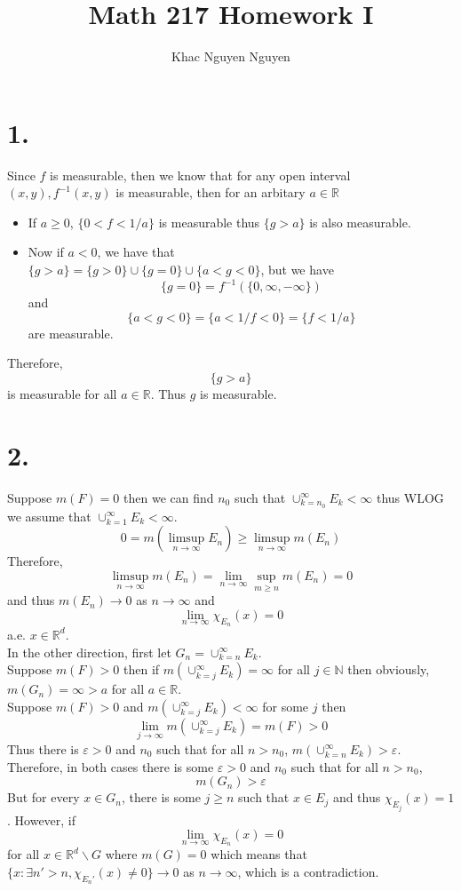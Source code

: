 \documentclass[11pt]{article}
\title{\textbf{Math 217 Homework I}}
\author{Khac Nguyen Nguyen}
\date{}
\theoremstyle{mystyle}
\theoremstyle{definition}
\begin{document}
\section*{1.}
Since $f$ is measurable, then we know that for any open interval $(x,y), f^{-1}(x,y)$ is measurable, then for an arbitary $a \in \mathbb{R}$
\begin{itemize}
  \item If $a \ge 0$, $\{0 < f < 1/a \}$ is measurable thus $\{g > a \}$ is also measurable. 
  \item Now if $a < 0$, we have that \\
    $\{g > a\} = \{g > 0\} \cup \{g = 0\} \cup \{a < g < 0\}$, but we have 
    \[
      \{g = 0 \} = f^{-1}(\{0, \infty, -\infty\})
    \]
    and
    \[
      \{a < g < 0\} = \{a < 1/f < 0\} = \{f < 1/a\}
    \]
    are measurable.  
\end{itemize}
Therefore, 
\[
  \{g>a\}
\]
is measurable for all $a \in \mathbb{R}$. Thus $g$ is measurable.
\newpage
\section*{2.}
Suppose $m(F) = 0$ then we can find $n_0$ such that $\cup_{k = n_0}^\infty E_k < \infty$ thus WLOG we assume that $\cup_{k=1}^\infty E_k < \infty$.  
\[
  0 = m(\limsup_{n \to \infty} E_n) \ge \limsup_{n \to \infty} m(E_n)
\]
Therefore, 
\[
  \limsup_{n \to \infty} m(E_n) = \lim_{n \to \infty} \sup_{m \ge n} m(E_n) = 0
\]
and thus $m(E_n) \to 0$ as $n \to \infty$ and 
\[
  \lim_{n \to \infty} \chi_{E_n}(x) = 0
\]
a.e. $x \in \mathbb{R}^d$. \\
In the other direction, first let $G_n = \cup_{k=n}^\infty E_k$. \\
Suppose $m(F) > 0$ then if $m\left(\cup_{k=j}^\infty E_k \right) = \infty$ for all $j \in \mathbb{N}$ then obviously, $m(G_n) = \infty > a$ for all $a \in \mathbb{R}$. \\ 
Suppose $m(F) > 0$ and $m\left(\cup_{k=j}^\infty E_k \right) < \infty$ for some $j$ then 
\[
  \lim_{j \to \infty} m(\cup_{k=j}^\infty E_k) = m(F) > 0
\]
Thus there is $\varepsilon > 0$ and $n_0$ such that for all $n>n_0$, $m(\cup_{k=n}^\infty E_k) > \varepsilon$. \\
Therefore, in both cases there is some $\varepsilon > 0$ and $n_0$ such that for all $n>n_0$, 
\[
  m(G_n) > \varepsilon
\]
But for every $x \in G_n$, there is some $j \ge n$ such that $x \in E_j$ and thus $\chi_{E_j}(x) = 1$. However, if  
\[
  \lim_{n \to \infty} \chi_{E_n}(x) = 0 
\]
for all $x \in \mathbb{R}^d \backslash G$ where $m(G) = 0$ which means that $\{x: \exists n' > n, \chi_{E_n'}(x) \ne 0\} \to 0$ as $n \to \infty$, which is a contradiction. \\
\newpage
\end{document}
